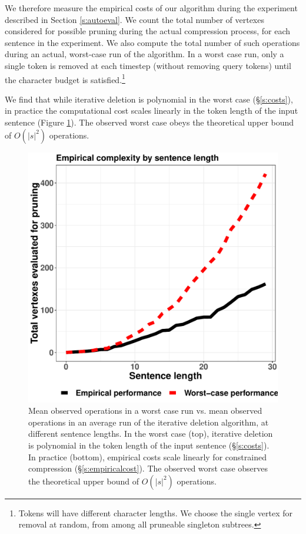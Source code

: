 \documentclass[11pt,a4paper]{article}
\begin{document}
We therefore measure the empirical costs of our algorithm during the experiment described in Section \ref{s:autoeval}. We count the total number of vertexes considered for possible pruning during the actual compression process, for each sentence in the experiment. We also compute the total number of such operations during an actual, worst-case run of the algorithm. In a worst case run, only a single token is removed at each timestep (without removing query tokens) until the character budget is satisfied.\footnote{Tokens will have different character lengths. We choose the single vertex for removal at random, from among all pruneable singleton subtrees.} 

We find that while iterative deletion is polynomial in the worst case (\S\ref{s:costs}), in practice the computational cost scales linearly in the token length of the input sentence (Figure \ref{f:example}). The observed worst case obeys the theoretical upper bound of $O(|s|^2)$ operations.

\begin{figure}[htb!]
\centering
\includegraphics[width=.5\textwidth]{observed.pdf}
\caption{Mean observed operations in a worst case run vs. mean observed operations in an average run of the iterative deletion algorithm, at different sentence lengths. In the worst case (top), iterative deletion is polynomial in the token length of the input sentence (\S\ref{s:costs}). In practice (bottom), empirical costs scale linearly for constrained compression (\S\ref{s:empiricalcost}). The observed worst case observes the theoretical upper bound of $O(|s|^2)$ operations.}
\label{f:example}
\end{figure}

\end{document}
